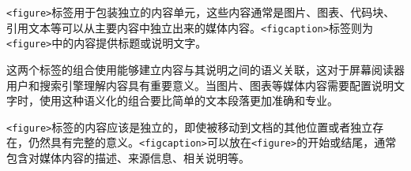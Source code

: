 \texttt{\textless{}figure\textgreater{}}标签用于包装独立的内容单元，这些内容通常是图片、图表、代码块、引用文本等可以从主要内容中独立出来的媒体内容。\texttt{\textless{}figcaption\textgreater{}}标签则为\texttt{\textless{}figure\textgreater{}}中的内容提供标题或说明文字。

这两个标签的组合使用能够建立内容与其说明之间的语义关联，这对于屏幕阅读器用户和搜索引擎理解内容具有重要意义。当图片、图表等媒体内容需要配置说明文字时，使用这种语义化的组合要比简单的文本段落更加准确和专业。

\texttt{\textless{}figure\textgreater{}}标签的内容应该是独立的，即使被移动到文档的其他位置或者独立存在，仍然具有完整的意义。\texttt{\textless{}figcaption\textgreater{}}可以放在\texttt{\textless{}figure\textgreater{}}的开始或结尾，通常包含对媒体内容的描述、来源信息、相关说明等。

\begin{Shaded}
\begin{Highlighting}[]
\DataTypeTok{\textless{}}\DataTypeTok{\textgreater{}}
    \DataTypeTok{\textless{}}\OperatorTok{=}\OperatorTok{=}\OperatorTok{=}\DataTypeTok{\textgreater{}\textless{}/}\DataTypeTok{\textgreater{}}
    \DataTypeTok{\textless{}}\DataTypeTok{\textgreater{}}
        \DataTypeTok{\textless{}}\DataTypeTok{\textgreater{}}
    \DataTypeTok{\textless{}/}\DataTypeTok{\textgreater{}}
\DataTypeTok{\textless{}/}\DataTypeTok{\textgreater{}}

\DataTypeTok{\textless{}}\DataTypeTok{\textgreater{}}
    \DataTypeTok{\textless{}}\OperatorTok{=}\OperatorTok{=}\OperatorTok{=}\OperatorTok{=}\DataTypeTok{\textgreater{}}
    \DataTypeTok{\textless{}}\DataTypeTok{\textgreater{}}
        \DataTypeTok{\textless{}}\DataTypeTok{\textgreater{}}
    \DataTypeTok{\textless{}/}\DataTypeTok{\textgreater{}}
\DataTypeTok{\textless{}/}\DataTypeTok{\textgreater{}}
\end{Highlighting}
\end{Shaded}

